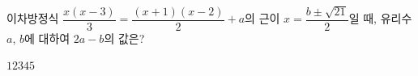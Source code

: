 이차방정식 $\dfrac{x(x-3)}{3}=\dfrac{(x+1)(x-2)}{2}+a$의 근이 $x=\dfrac{b\pm\sqrt{21}}{2}$일 때, 유리수 $a$, $b$에 대하여 $2a-b$의 값은?
\begin{choices32}{$1$}{$2$}{$3$}{$4$}{$5$}\end{choices32}
